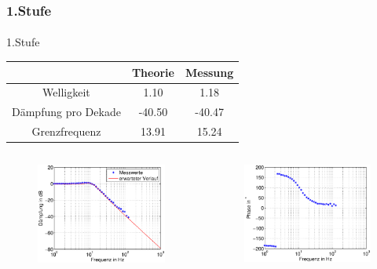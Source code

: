 \begin{frame}
\frametitle{1.Stufe}
\framesubtitle{}
    \begin{block}{1.Stufe}
        \begin{tabular}{c|c|c}
        & Theorie & Messung \\ 
        \hline
        Welligkeit &1.10 &1.18 \\
        Dämpfung pro Dekade &-40.50 & -40.47\\
        Grenzfrequenz &13.91 & 15.24
        \end{tabular}
    \end{block}
\begin{columns}[c]
    \begin{figure}[H]
    \begin{center}
            \includegraphics[scale=0.3]{./img/plots/Auf_4_bode_links_db.eps}
    \end{center}
    \end{figure}
    \begin{figure}[H]
    \begin{center}
            \includegraphics[scale=0.3]{./img/plots/Auf_4_bode_links_ph.eps}

\end{center}
\end{figure}
\end{columns}
\end{frame}
